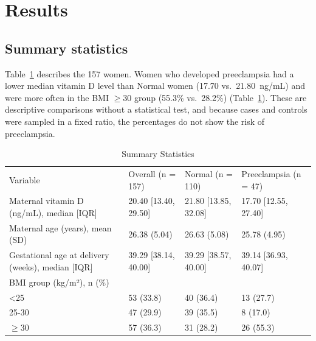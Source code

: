 \documentclass{article}
\begin{document}
\section{Results}

\subsection{Summary statistics}
Table~\ref{tab:summary} describes the 157 women. Women who developed preeclampsia
had a lower median vitamin D level than Normal women (17.70 vs.\ 21.80~ng/mL) and
were more often in the BMI $\geq$30 group (55.3\% vs.\ 28.2\%)
(Table~\ref{tab:summary}). These are descriptive comparisons without a statistical
test, and because cases and controls were sampled in a fixed ratio, the percentages do
not show the risk of preeclampsia.

\begin{table}[H]
\centering
\caption{Summary Statistics}
\label{tab:summary}
\begin{tabular}{llll}
Variable                                              & Overall (n = 157)        & Normal (n = 110)         & Preeclampsia (n = 47)    \\
Maternal vitamin D (ng/mL), median {[}IQR{]}          & 20.40 {[}13.40, 29.50{]} & 21.80 {[}13.85, 32.08{]} & 17.70 {[}12.55, 27.40{]} \\
Maternal age (years), mean (SD)                       & 26.38 (5.04)             & 26.63 (5.08)             & 25.78 (4.95)             \\
Gestational age at delivery (weeks), median {[}IQR{]} & 39.29 {[}38.14, 40.00{]} & 39.29 {[}38.57, 40.00{]} & 39.14 {[}36.93, 40.07{]} \\
BMI group (kg/m²), n (\%)                             &                          &                          &                          \\
\textless{}25                                         & 53 (33.8)                & 40 (36.4)                & 13 (27.7)                \\
25-30                                                 & 47 (29.9)                & 39 (35.5)                & 8 (17.0)                 \\
$\geq$30                                              & 57 (36.3)                & 31 (28.2)                & 26 (55.3)               
\end{tabular}
\end{table}
\end{document}
